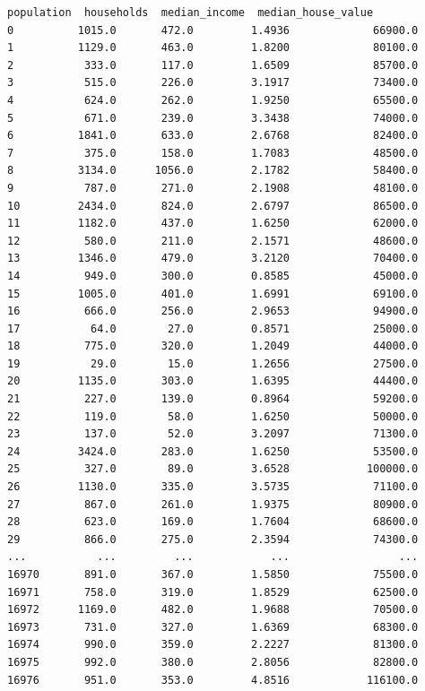 \begin{lstlisting}[style=outputcell]
       population  households  median_income  median_house_value  
0          1015.0       472.0         1.4936             66900.0  
1          1129.0       463.0         1.8200             80100.0  
2           333.0       117.0         1.6509             85700.0  
3           515.0       226.0         3.1917             73400.0  
4           624.0       262.0         1.9250             65500.0  
5           671.0       239.0         3.3438             74000.0  
6          1841.0       633.0         2.6768             82400.0  
7           375.0       158.0         1.7083             48500.0  
8          3134.0      1056.0         2.1782             58400.0  
9           787.0       271.0         2.1908             48100.0  
10         2434.0       824.0         2.6797             86500.0  
11         1182.0       437.0         1.6250             62000.0  
12          580.0       211.0         2.1571             48600.0  
13         1346.0       479.0         3.2120             70400.0  
14          949.0       300.0         0.8585             45000.0  
15         1005.0       401.0         1.6991             69100.0  
16          666.0       256.0         2.9653             94900.0  
17           64.0        27.0         0.8571             25000.0  
18          775.0       320.0         1.2049             44000.0  
19           29.0        15.0         1.2656             27500.0  
20         1135.0       303.0         1.6395             44400.0  
21          227.0       139.0         0.8964             59200.0  
22          119.0        58.0         1.6250             50000.0  
23          137.0        52.0         3.2097             71300.0  
24         3424.0       283.0         1.6250             53500.0  
25          327.0        89.0         3.6528            100000.0  
26         1130.0       335.0         3.5735             71100.0  
27          867.0       261.0         1.9375             80900.0  
28          623.0       169.0         1.7604             68600.0  
29          866.0       275.0         2.3594             74300.0  
...           ...         ...            ...                 ...  
16970       891.0       367.0         1.5850             75500.0  
16971       758.0       319.0         1.8529             62500.0  
16972      1169.0       482.0         1.9688             70500.0  
16973       731.0       327.0         1.6369             68300.0  
16974       990.0       359.0         2.2227             81300.0  
16975       992.0       380.0         2.8056             82800.0  
16976       951.0       353.0         4.8516            116100.0  

\end{lstlisting}
